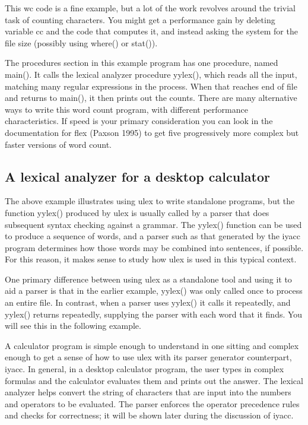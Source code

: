 This \textsf{wc} code is a fine example, but a lot of the work
revolves around the trivial task of counting characters. You might
get a performance gain by deleting variable cc and the code that
computes it, and instead asking the system for the file size (possibly
using \textsf{where()} or \textsf{stat()}).

The procedures section in this example program has one procedure,
named \textsf{main()}. It calls the lexical analyzer procedure
yylex(), which reads all the input, matching many regular expressions
in the process. When that reaches end of file and returns to main(),
it then prints out the counts. There are many alternative ways to
write this word count program, with different performance
characteristics. If speed is your primary consideration you can look in
the documentation for \textsf{flex} (Paxson 1995) to get five
progressively more complex but faster versions of word count.

\subsection{A lexical analyzer for a desktop calculator}

The above example illustrates using \textsf{ulex} to write standalone
programs, but the function \textsf{yylex()} produced by \textsf{ulex}
is usually called by a parser that does subsequent syntax checking
against a grammar. The \textsf{yylex()} function
can be used to produce a sequence of words, and a parser such as that
generated by the \textsf{iyacc} program determines how those words may
be combined into sentences, if possible. For this reason, it makes
sense to study how \textsf{ulex} is used in this typical context.

One primary difference between using \textsf{ulex} as a standalone tool and
using it to aid a parser is that in the earlier example, \textsf{yylex()} was
only called once to process an entire file. In contrast, when a parser uses
\textsf{yylex()} it calls it repeatedly, and \textsf{yylex()} returns
repeatedly, supplying the parser with each word that it finds. You will see
this in the following example.

A calculator program is simple enough to understand in one sitting and
complex enough to get a sense of how to use \textsf{ulex} with its
parser generator counterpart, \textsf{iyacc}. In general, in a desktop
calculator program, the user types in complex formulas and the
calculator evaluates them and prints out the answer.  The lexical
analyzer helps convert the string of characters that are input into
the numbers and operators to be evaluated.  The parser enforces the
operator precedence rules and checks for correctness; it will be shown
later during the discussion of \textsf{iyacc}.

